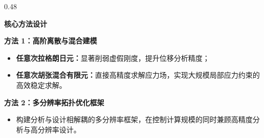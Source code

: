 \documentclass[notheorems]{beamer}
\begin{document}
\begin{frame}
\begin{columns}[t, totalwidth=\linewidth]
			\begin{column}{0.48\linewidth}
				\begin{tcolorbox}[
					colback=structure.fg, colframe=structure.fg,
					coltext=white, boxrule=0pt, arc=2pt,
					top=3pt, bottom=3pt, left=6pt, right=6pt,
					]
					\centering\bfseries 核心方法设计
				\end{tcolorbox}
				
				\vspace{0.4em}
				
				\begin{tcolorbox}[
					colback=panelbg, colframe=structure.fg!50,
					boxrule=0.5pt, arc=2pt,
					top=6pt, bottom=6pt, left=6pt, right=6pt,
					]
					{\fontsize{7.5}{11}\selectfont\sffamily
						\textbf{方法 1：高阶离散与混合建模}
						\setlength{\itemsep}{2pt}
						\setlength{\parsep}{0pt}
						\setlength{\topsep}{4pt}
						\begin{itemize}
							\item \textbf{任意次拉格朗日元：}显著削弱虚假刚度，提升位移分析精度；
							\item \textbf{任意次胡张混合有限元：}直接高精度求解应力场，实现大规模局部应力约束的高效稳定求解。
						\end{itemize}
						
						\vspace{8pt}
						\textbf{方法 2：多分辨率拓扑优化框架}
						\setlength{\itemsep}{2pt}
						\setlength{\parsep}{0pt}
						\setlength{\topsep}{4pt}
						\begin{itemize}
							\item 构建分析与设计相解耦的多分辨率框架，在控制计算规模的同时兼顾高精度分析与高分辨率设计。
						\end{itemize}
					}
				\end{tcolorbox}
			\end{column}
			
		\end{columns}
		
	\end{frame}
	
\end{document}
